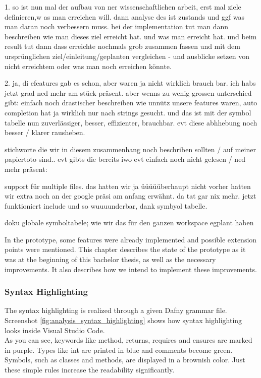 1. so ist nun mal der aufbau von ner wissenschaftlichen arbeit, erst mal ziele definieren,w as man erreichen will. dann analyse des ist zustands und ggf was man daran noch verbessern muss. bei der implementation tut man dann beschreiben wie man dieses ziel erreicht hat. und was man erreicht hat. und beim result tut dann dass erreichte nochmals grob zusammen fassen und mit dem ursprünglichen ziel/einleitung/geplanten vergleichen - und ausblicke setzen von nicht erreichtem oder was man noch erreichen könnte.

2. ja, di efeatures gab es schon, aber waren ja nicht wirklich brauch bar.
ich habs jetzt grad ned mehr am stück präsent. aber wenns zu wenig grossen unterschied gibt:
einfach noch drastischer beschreiben wie unnütz unsere features waren, auto completion hat ja wirklich nur nach strings gesucht.
und das ist mit der symbol tabelle nun zuverlässiger, besser, effizienter, brauchbar. evt diese abhhebung noch besser / klarer rausheben.

stichworte die wir in diesem zusammenhang noch beschriben sollten / auf meiner papiertoto sind.. evt gibts die bereits iwo evt einfach noch nicht gelesen / ned mehr präsent:

support für multiple files. das hatten wir ja üüüüüberhaupt nicht vorher hatten wir extra noch an der google präsi am anfang erwähnt. da tat gar nix mehr. jetzt funktioniert include und so wuuuunderbar, dank symbyol tabelle.

doku globale symboltabele; wie wir das für den ganzen workspace egplant haben


In the prototype, some features were already implemented and possible extension points were mentioned.
This chapter describes the state of the prototype as it was at the beginning of this bachelor thesis, as well as the necessary improvements.
It also describes how we intend to implement these improvements.

\subsubsection{Syntax Highlighting}
The syntax highlighting is realized through a given Dafny grammar file.
Screenshot \ref{fig:analysis_syntax_highlighting} shows how syntax highlighting looks inside Visual Studio Code. \\

As you can see, keywords like method, returns, requires and ensures are marked in purple.
Types like int are printed in blue and comments become green.
Symbols, such as classes and methods, are displayed in a brownish color.
Just these simple rules increase the readability significantly.

